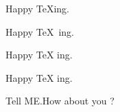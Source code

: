\documentclass{article}
\begin{document}
	
		Happy \TeX ing. 
		
		Happy \TeX\ ing. 
	
	Happy \TeX{} ing. 
	
		Happy {\TeX} ing.
		
	Tell ME.How about you ?
		
		
\end{document}
